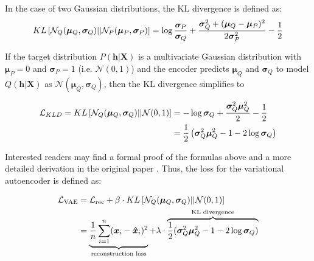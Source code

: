 In the case of two Gaussian distributions, the KL divergence is defined as:
\begin{align}\eqlbl{hso_4}
	KL\left[ \mathcal{N}_Q(\boldsymbol{\mu}_Q, \boldsymbol{\sigma}_Q)||\mathcal{N}_P(\boldsymbol{\mu}_P, \boldsymbol{\sigma}_P) \right] = \log \frac{\boldsymbol{\sigma}_P}{\boldsymbol{\sigma}_Q} + \frac{\boldsymbol{\sigma}_Q^2 + (\boldsymbol{\mu}_Q-\boldsymbol{\mu}_P)^2}{2\boldsymbol{\sigma}_P^2} - \frac{1}{2}
\end{align}


If the target distribution $P(\boldsymbol{h}|\boldsymbol{X})$ is a multivariate Gaussian distribution with $\boldsymbol{\mu}_P = 0$ and $\boldsymbol{\sigma}_P=1$ (i.e. $\mathcal{N}(0, 1)$) and the encoder predicts $\boldsymbol{\mu}_Q$ and $\boldsymbol{\sigma}_Q$ to model $Q(\boldsymbol{h}|\boldsymbol{X})$ as $\mathcal{N}(\boldsymbol{\mu}_Q, \boldsymbol{\sigma}_Q)$, then the KL divergence simplifies to


\begin{align}\eqlbl{hso_5}
\begin{split}
		\mathcal{L}_{KLD} = KL \left[ \mathcal{N}_Q(\boldsymbol{\mu}_Q, \boldsymbol{\sigma}_Q)||\mathcal{N}(0, 1) \right] & = -\log \boldsymbol{\sigma}_Q + \frac{\boldsymbol{\sigma}_Q^2 \boldsymbol{\mu}_Q^2}{2} - \frac{1}{2} \\
		 & = \frac{1}{2} \left( \boldsymbol{\sigma}_Q^2 \boldsymbol{\mu}_Q^2 - 1 - 2\log \boldsymbol{\sigma}_Q \right)
\end{split}
\end{align}

Interested readers may find a formal proof of the formulas above and a more detailed derivation in the original paper \cite{Kingma_Welling_2014}.
Thus, the loss for the variational autoencoder is defined as:


\begin{align}\eqlbl{hso_6}
\begin{split}
		\mathcal{L}_{\text{VAE}} & = \mathcal{L}_{\text{rec}} + \beta \cdot KL \left[ \mathcal{N}_Q(\boldsymbol{\mu}_Q, \boldsymbol{\sigma}_Q)||\mathcal{N}(0, 1) \right] \\
		  & = \underbrace{\frac{1}{n} \sum_{i=1}^{n} (\boldsymbol{x}_i - \boldsymbol{\hat{x}}_i)^2}_{\text{reconstruction loss}} + \lambda \cdot \overbrace{\frac{1}{2} (\boldsymbol{\sigma}_Q^2 \boldsymbol{\mu}_Q^2 - 1 - 2\log \boldsymbol{\sigma}_Q)}^{\text{KL divergence}}
\end{split}
\end{align}

